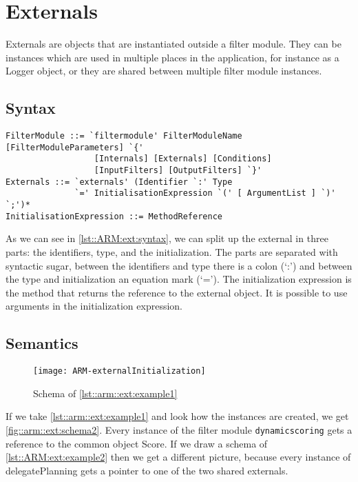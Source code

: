 \chapter{Externals}
Externals are objects that are instantiated outside a filter module.
They can be instances which are used in multiple places in the application, for instance
as a Logger object, or they are shared between multiple filter module instances.

\section*{Syntax}
\begin{lstlisting}[caption = {Externals syntax}, label = lst::ARM:ext:syntax,
style = listing, language = ebnf, float = tpb]
FilterModule ::= `filtermodule' FilterModuleName [FilterModuleParameters] `{'
                  [Internals] [Externals] [Conditions]
                  [InputFilters] [OutputFilters] `}'
Externals ::= `externals' (Identifier `:' Type 
              `=' InitialisationExpression `(' [ ArgumentList ] `)' `;')* 
InitialisationExpression ::= MethodReference                
\end{lstlisting}
As we can see in \autoref{lst::ARM:ext:syntax}, we can split up the external in three parts: the identifiers, type, and the initialization. The parts are
separated with syntactic sugar, between the identifiers and type there is a colon (`:') and
between the type and initialization an equation mark (`=').
The initialization expression is the method that returns the reference to the external object.
It is possible to use arguments in the initialization expression.

\section*{Semantics}
\begin{figure}[tpb]
	\centering
	\texttt{[image: ARM-externalInitialization]}
	\caption{Schema of \autoref{lst::arm::ext:example1}}
	\label{fig::arm::ext:schema2}
\end{figure}
If we take \autoref{lst::arm::ext:example1} and look how the instances are created, we get \autoref{fig::arm::ext:schema2}.
Every instance of the filter module \lstinline!dynamicscoring! gets a reference to the common object Score.
If we draw a schema of \autoref{lst::ARM:ext:example2} then we get a different picture, because every instance of delegatePlanning gets a pointer to one of the two shared externals.

